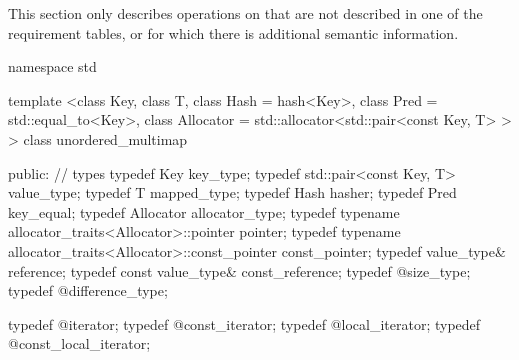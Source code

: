 \pnum
This section only describes operations on 
that are not described in one of the requirement tables, or for which
there is additional semantic information.

%
\begin{codeblock}
namespace std {
  template <class Key,
            class T,
            class Hash  = hash<Key>,
            class Pred  = std::equal_to<Key>,
            class Allocator = std::allocator<std::pair<const Key, T> > >
  class unordered_multimap
  {
  public:
    // types
    typedef Key                                                 key_type;
    typedef std::pair<const Key, T>                             value_type;
    typedef T                                                   mapped_type;
    typedef Hash                                                hasher;
    typedef Pred                                                key_equal;
    typedef Allocator                                           allocator_type;
    typedef typename allocator_traits<Allocator>::pointer       pointer;
    typedef typename allocator_traits<Allocator>::const_pointer const_pointer;
    typedef value_type&                                         reference;
    typedef const value_type&                                   const_reference;
    typedef @\impdef@                              size_type;
    typedef @\impdef@                              difference_type;

    typedef @\impdef@                              iterator;
    typedef @\impdef@                              const_iterator;
    typedef @\impdef@                              local_iterator;
    typedef @\impdef@                              const_local_iterator;

}}
\end{codeblock}
